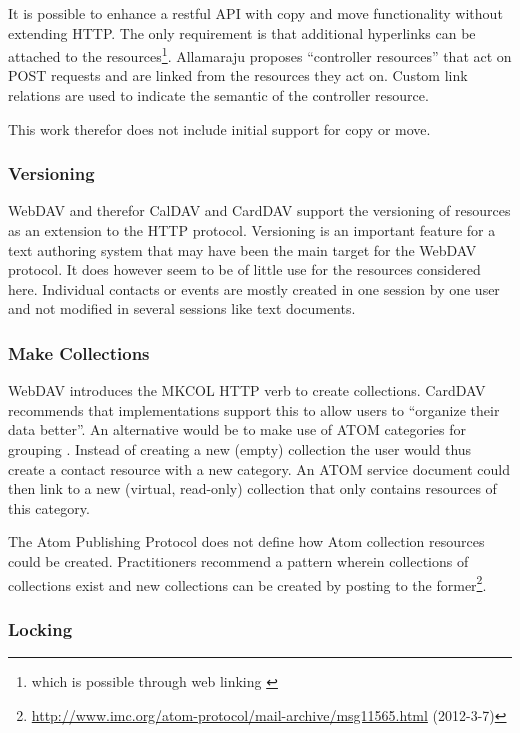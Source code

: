 \documentclass[11pt,a4paper,headsepline,twoside]{scrartcl}		%
\newcommand{\citeurl}[2]{\url{#1} (#2)}
\begin{document}
It is possible to enhance a restful API with copy and move functionality without
extending HTTP. The only requirement is that additional hyperlinks can be
attached to the resources\footnote{which is possible through web
  linking \cite{RFC5988}}. Allamaraju \cite[Ch. 11]{Allamaraju_2010} proposes
``controller resources'' that act on POST requests and are linked from the
resources they act on. Custom link relations are used to indicate the semantic
of the controller resource.

This work therefor does not include initial support for copy or move.

\subsubsection{Versioning}

WebDAV and therefor CalDAV and CardDAV support the versioning of resources as an
extension to the HTTP protocol. Versioning is an important feature for a text
authoring system that may have been the main target for the WebDAV protocol.  It
does however seem to be of little use for the resources considered
here. Individual contacts or events are mostly created in one session by one
user and not modified in several sessions like text documents.

\subsubsection{Make Collections}

WebDAV introduces the MKCOL HTTP verb to create collections. CardDAV recommends
that implementations support this to allow users to ``organize their data
better''. An alternative would be to make use of ATOM categories for
grouping \cite{RFC5023}. Instead of creating a new (empty) collection the user
would thus create a contact resource with a new category. An ATOM service
document could then link to a new (virtual, read-only) collection that only
contains resources of this category.

The Atom Publishing Protocol does not define how Atom collection resources could
be created. Practitioners recommend a pattern wherein collections of collections
exist and new collections can be created by posting to the
former\footnote{\citeurl{http://www.imc.org/atom-protocol/mail-archive/msg11565.html}{2012-3-7}}.

\subsubsection{Locking}
\label{sec:locking}
\end{document}
